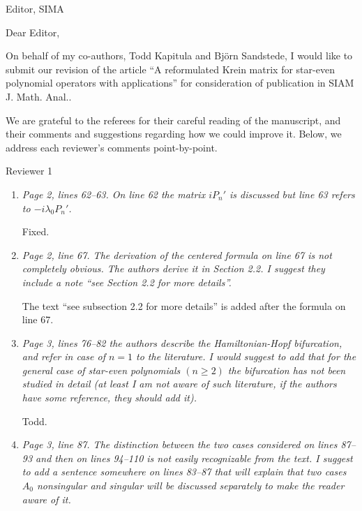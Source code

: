 \documentclass[11pt]{letter}
\begin{document}
\address{Ross Parker \\
Division of Applied Mathematics \\
Brown University \\
Providence, RI 02912 \\
\texttt{ross\_parker@brown.edu}}%
\signature{Ross Parker}
\begin{letter}{Editor, SIMA}

\opening{Dear Editor,}

On behalf of my co-authors, Todd Kapitula and Bj\"orn Sandstede, I would like to submit our revision of the article ``A reformulated Krein matrix for star-even polynomial operators with applications'' for consideration of publication in SIAM J. Math. Anal..

We are grateful to the referees for their careful reading of the manuscript, and their comments and suggestions regarding how we could improve it. Below, we address each reviewer's comments point-by-point.

Reviewer 1
\begin{enumerate}

\item \emph{Page 2, lines 62–63. On line 62 the matrix $iP_n'$ is discussed but line 63 refers to $-i\lambda_0 P_n'$.}
\vspace{4mm}

Fixed.

\item \emph{Page 2, line 67. The derivation of the centered formula on line 67 is not completely obvious. The authors derive it in Section 2.2. I suggest they include a note ``see Section 2.2 for more details''.}
\vspace{4mm}

The text ``see subsection 2.2 for more details'' is added after the formula on line 67.

\item \emph{Page 3, lines 76–82 the authors describe the Hamiltonian-Hopf bifurcation, and refer in case of $n = 1$ to the literature. I would suggest to add that for the general case of star-even polynomials $(n \geq 2)$ the bifurcation has not been studied in detail (at least I am not aware of such literature, if the authors have some reference, they should add it).}
\vspace{4mm}

Todd.

\item \emph{Page 3, line 87. The distinction between the two cases considered on lines 87–93 and then on lines 94–110 is not easily recognizable from the text. I suggest to add a sentence somewhere on lines 83–87 that will explain that two cases $A_0$ nonsingular and singular will be discussed separately to make the reader aware of it.}
\vspace{4mm}


\end{enumerate}
\end{letter}
\end{document}
